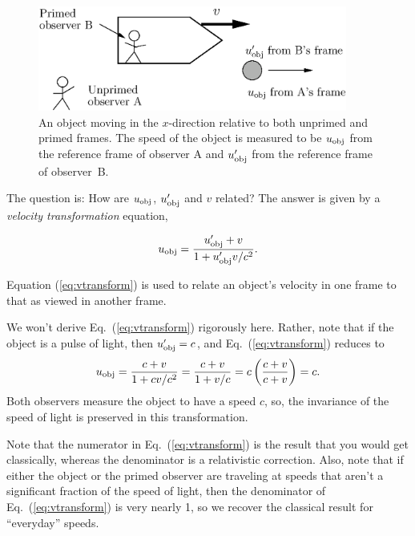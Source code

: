 \begin{figure}[tbp]
\begin{center}
\includegraphics[width=4in]{basic_postulates_of_relativity/rel1_vtransform.eps}
\end{center}
\caption{An object moving in the $x$-direction relative to both
unprimed and primed frames.  The speed of the object is measured to be
$u_{\rm obj}$ from the reference frame of observer A and 
$u_{\rm obj}^\prime$ from the reference frame of observer~B.}
\label{fig:rel1_vtransform}
\end{figure}   

The question is: How are $u_{\rm obj}$, $u^\prime_{\rm obj}$ and $v$ related?
The answer is given by a {\em velocity transformation} equation,

\begin{boxiteq}
{\begin{equation}
u_{\rm obj} = \frac{u_{\rm obj}^\prime + v}{1 + u_{\rm obj}^\prime v/c^2}.
\label{eq:vtransform}
\end{equation}}
\end{boxiteq}
                                                
\noindent Equation (\ref{eq:vtransform}) is used to relate an object's
velocity in one frame to that as viewed in another frame.

We won't derive Eq.~(\ref{eq:vtransform}) rigorously here.  Rather,
note that if the object is a pulse of light, then $u_{\rm obj}^\prime
= c$, and Eq.~(\ref{eq:vtransform}) reduces to
\begin{equation}
u_{\rm obj} = \frac{c+v}{1 + cv/c^2} = \frac{c+v}{1+v/c} = 
c\left(\frac{c+v}{c+v}\right) = c.
\end{equation}
Both observers measure the object to have a speed $c$, so, the
invariance of the speed of light is preserved in this transformation.

Note that the numerator in Eq.~(\ref{eq:vtransform}) is the result
that you would get classically, whereas the denominator is a
relativistic correction. Also, note that if either the object or the
primed observer are traveling at speeds that aren't a significant
fraction of the speed of light, then the denominator of
Eq.~(\ref{eq:vtransform}) is very nearly 1, so we recover the
classical result for ``everyday'' speeds.
    
